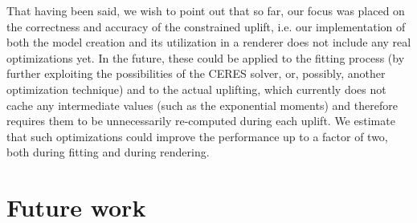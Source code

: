 That having been said, we wish to point out that so far, our focus was placed on the correctness and accuracy of the constrained uplift, i.e. our implementation of both the model creation and its utilization in a renderer does not include any real optimizations yet. In the future, these could be applied to the fitting process (by further exploiting the possibilities of the CERES solver, or, possibly, another optimization technique) and to the actual uplifting, which currently does not cache any intermediate values (such as the exponential moments) and therefore requires them to be unnecessarily re-computed during each uplift. We estimate that such optimizations could improve the performance up to a factor of two, both during fitting and during rendering.

\section{Future work}


